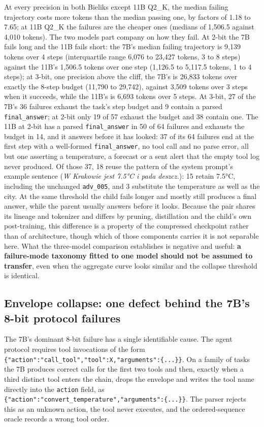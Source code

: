 \documentclass[11pt]{article}
\begin{document}
At every precision in both Bieliks except 11B Q2\_K, the median failing trajectory costs more tokens than the median passing one, by factors of 1.18 to 7.65; at 11B Q2\_K the failures are the cheaper ones (medians of 1{,}506.5 against 4{,}010 tokens). The two models part company on how they fail. At 2-bit the 7B fails long and the 11B fails short: the 7B's median failing trajectory is 9{,}139 tokens over 4 steps (interquartile range 6{,}076 to 23{,}427 tokens, 3 to 8 steps) against the 11B's 1{,}506.5 tokens over one step (1{,}126.5 to 5{,}117.5 tokens, 1 to 4 steps); at 3-bit, one precision above the cliff, the 7B's is 26{,}833 tokens over exactly the 8-step budget (11{,}790 to 29{,}742), against 3{,}509 tokens over 3 steps when it succeeds, while the 11B's is 6{,}693 tokens over 5 steps. At 3-bit, 27 of the 7B's 36 failures exhaust the task's step budget and 9 contain a parsed \texttt{final\_answer}; at 2-bit only 19 of 57 exhaust the budget and 38 contain one. The 11B at 2-bit has a parsed \texttt{final\_answer} in 50 of 64 failures and exhausts the budget in 14, and it answers before it has looked: 37 of its 64 failures end at the first step with a well-formed \texttt{final\_answer}, no tool call and no parse error, all but one asserting a temperature, a forecast or a sent alert that the empty tool log never produced. Of those 37, 18 reuse the pattern of the system prompt's example sentence (\emph{W Krakowie jest 7.5°C i pada deszcz.}): 15 retain 7.5°C, including the unchanged \texttt{adv\_005}, and 3 substitute the temperature as well as the city. At the same threshold the child fails longer and mostly still produces a final answer, while the parent usually answers before it looks. Because the pair shares its lineage and tokenizer and differs by pruning, distillation and the child's own post-training, this difference is a property of the compressed checkpoint rather than of architecture, though which of those components carries it is not separable here. What the three-model comparison establishes is negative and useful: \textbf{a failure-mode taxonomy fitted to one model should not be assumed to transfer}, even when the aggregate curve looks similar and the collapse threshold is identical.

\subsection{Envelope collapse: one defect behind the 7B's 8-bit protocol failures}
\label{sec:envelope}
The 7B's dominant 8-bit failure has a single identifiable cause. The agent protocol requires tool invocations of the form \verb|{"action":"call_tool","tool":X,"arguments":{...}}|. On a family of tasks the 7B produces correct calls for the first two tools and then, exactly when a third distinct tool enters the chain, drops the envelope and writes the tool name directly into the \texttt{action} field, as \verb|{"action":"convert_temperature","arguments":{...}}|. The parser rejects this as an unknown action, the tool never executes, and the ordered-sequence oracle records a wrong tool order.
\end{document}
